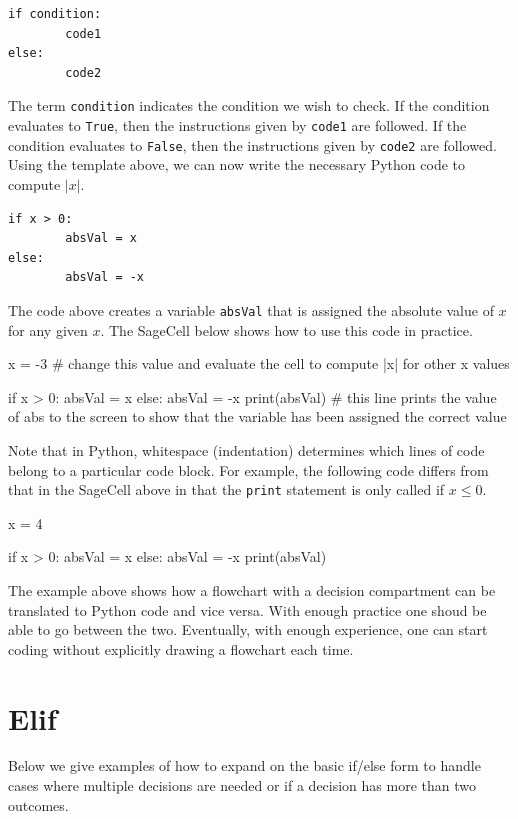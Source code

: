 \documentclass{ximera}
\begin{document}
\begin{verbatim}
if condition:
        code1
else:
        code2
\end{verbatim}

The term \verb|condition| indicates the condition we wish to check. If the condition evaluates to \verb|True|, then the instructions given by \verb|code1| are followed. If the condition evaluates to \verb|False|, then the instructions given by \verb|code2| are followed. Using the template above, we can now write the necessary Python code to compute $|x|$.

\begin{verbatim}
if x > 0:
        absVal = x
else:
        absVal = -x
\end{verbatim}

The code above creates a variable \verb|absVal| that is assigned the absolute value of $x$ for any given $x$. The SageCell below shows how to use this code in practice.

\begin{sageCell}
x = -3               # change this value and evaluate the cell to compute |x| for other x values

if x > 0:
	absVal = x
else:
	absVal = -x
print(absVal)        # this line prints the value of abs to the screen to show that the variable has been assigned the correct value
\end{sageCell}

Note that in Python, whitespace (indentation) determines which lines of code belong to a particular code block. For example, the following code differs from that in the SageCell above in that the \verb|print| statement is only called if $x\leq 0$.

\begin{sageCell}
x = 4

if x > 0:
	absVal = x
else:
	absVal = -x
	print(absVal)
\end{sageCell}

The example above shows how a flowchart with a decision compartment can be translated to Python code and vice versa. With enough practice one shoud be able to go between the two. Eventually, with enough experience, one can start coding without explicitly drawing a flowchart each time.

\section{Elif}

Below we give examples of how to expand on the basic if/else form to handle cases where multiple decisions are needed or if a decision has more than two outcomes. 
\end{document}
